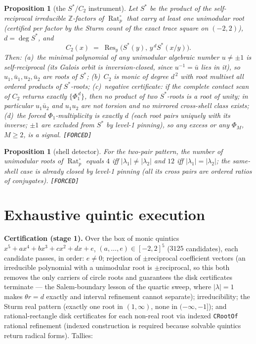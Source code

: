 \documentclass[11pt]{article}
\newcommand{\F}{\textnormal{\texttt{[FORCED]}}}
\newcommand{\Z}{\mathbb{Z}}
\newcommand{\Rat}{\operatorname{Rat}}
\newcommand{\Res}{\operatorname{Res}}
\newtheorem{proposition}[theorem]{Proposition}
\theoremstyle{definition}
\begin{document}
\begin{proposition}[the $S^{*}/C_2$ instrument]\label{prop:c2}
Let $S^{*}$ be the product of the self-reciprocal irreducible $\Z$-factors of
$\Rat_p^{\circ}$ that carry at least one unimodular root (certified per factor
by the Sturm count of the exact trace square on $(-2,2)$), $d=\deg S^{*}$, and
\[
C_2(x)\;=\;\Res_y\bigl(S^{*}(y),\,y^{\,d}S^{*}(x/y)\bigr).
\]
Then: (a)~the minimal polynomial of any unimodular algebraic number $u\neq\pm1$
is self-reciprocal (its Galois orbit is inversion-closed, since
$u^{-1}=\bar u$ lies in it), so $u_1,\bar u_1,u_2,\bar u_2$ are roots of
$S^{*}$; (b)~$C_2$ is monic of degree $d^{\,2}$ with root multiset all ordered
products of $S^{*}$-roots; (c)~\emph{negative certificate}: if the complete
contact scan of $C_2$ returns exactly $\{\Phi_1^{\,d}\}$, then no product of two
$S^{*}$-roots is a root of unity; in particular $u_1\bar u_2$ and $u_1u_2$ are
not torsion and no mirrored cross-shell class exists; (d)~the forced
$\Phi_1$-multiplicity is exactly $d$ (each root pairs uniquely with its inverse;
$\pm1$ are excluded from $S^{*}$ by level-1 pinning), so any excess or any
$\Phi_M$, $M\ge2$, is a signal. \F
\end{proposition}

\begin{proposition}[shell detector]\label{prop:shells}
For the two-pair pattern, the number of unimodular roots of $\Rat_p^{\circ}$
equals $4$ iff $|\lambda_1|\neq|\lambda_2|$ and $12$ iff
$|\lambda_1|=|\lambda_2|$; the same-shell case is already closed by level-1
pinning (all its cross pairs are ordered ratios of conjugates). \F
\end{proposition}

\section{Exhaustive quintic execution}\label{sec:quintic}

\textbf{Certification (stage 1).} Over the box of monic quintics
$x^5+ax^4+bx^3+cx^2+dx+e$, $(a,\dots,e)\in[-2,2]^5$ ($3125$ candidates), each
candidate passes, in order: $e\neq0$; rejection of $\pm$reciprocal coefficient
vectors (an irreducible polynomial with a unimodular root is $\pm$reciprocal,
so this both removes the only carriers of circle roots and guarantees the disk
certificates terminate --- the Salem-boundary lesson of the quartic sweep, where
$|\lambda|=1$ makes $\theta r=d$ exactly and interval refinement cannot
separate); irreducibility; the Sturm real pattern (exactly one root in
$(1,\infty)$, none in $(-\infty,-1]$); and rational-rectangle disk certificates
for each non-real root via indexed \texttt{CRootOf} rational refinement
(indexed construction is required because solvable quintics return radical
forms). Tallies:
\end{document}

